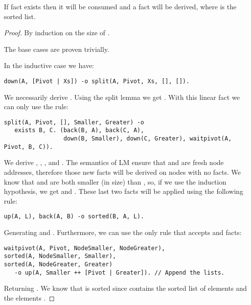 \begin{theorem}
If fact  exists then it will be consumed and a  fact will be derived, where  is the sorted list.
\end{theorem}
\begin{proof}
By induction on the size of .

The base cases are proven trivially.

In the inductive case we have:
\begin{Verbatim}[fontsize=\codesize]
down(A, [Pivot | Xs]) -o split(A, Pivot, Xs, [], []).
\end{Verbatim}

We necessarily derive . Using the split lemma
we get . With this linear fact we
can only use the rule:

\begin{Verbatim}[fontsize=\codesize]
split(A, Pivot, [], Smaller, Greater) -o
   exists B, C. (back(B, A), back(C, A),
                 down(B, Smaller), down(C, Greater), waitpivot(A, Pivot, B, C)).
\end{Verbatim}

We derive , , ,
 and . The semantics of
LM ensure that  and  are fresh node addresses, therefore those
new facts will be derived on nodes with no facts. We know that 
and  are both smaller (in size) than , so, if we use the
induction hypothesis, we get  and .
These last two facts will be applied using the following rule:

\begin{Verbatim}[fontsize=\codesize]
up(A, L), back(A, B) -o sorted(B, A, L).
\end{Verbatim}

Generating  and .
Furthermore, we can use the only rule that accepts  and
 facts:

\begin{Verbatim}[fontsize=\codesize]
waitpivot(A, Pivot, NodeSmaller, NodeGreater),
sorted(A, NodeSmaller, Smaller),
sorted(A, NodeGreater, Greater)
   -o up(A, Smaller ++ [Pivot | Greater]). // Append the lists.
\end{Verbatim}

Returning .  We know that
 is sorted since  contains the
sorted list of elements  and  the elements .

\end{proof}

